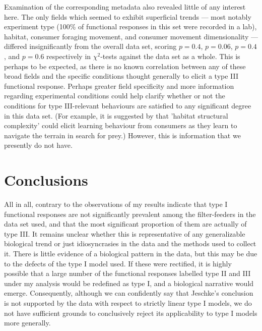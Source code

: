 \documentclass[11pt]{article}
\begin{document}
    Examination of the corresponding metadata also revealed little of any interest here. The only fields which seemed to exhibit superficial trends — most notably experiment type (100\% of functional responses in this set were recorded in a lab), habitat, consumer foraging movement, and consumer movement dimensionality — differed insignificantly from the overall data set, scoring $p=0.4$, $p=0.06$, $p=0.4$, and $p=0.6$ respectively in $\chi^2$-tests against the data set as a whole. This is perhaps to be expected, as there is no known correlation between any of these broad fields and the specific conditions thought generally to elicit a type III functional response. Perhaps greater field specificity and more information regarding experimental conditions could help clarify whether or not the conditions for type III-relevant behaviours are satisfied to any significant degree in this data set. (For example, it is suggested by \citet{pawar2012dimensionality} that 'habitat structural complexity' could elicit learning behaviour from consumers as they learn to navigate the terrain in search for prey.) However, this is information that we presently do not have.
    
    \section{Conclusions}
    
    All in all, contrary to the observations of \citet{jeschke2004consumer} my results indicate that type I functional responses are not significantly prevalent among the filter-feeders in the data set used, and that the most significant proportion of them are actually of type III. It remains unclear whether this is representative of any generalizable biological trend or just idiosyncrasies in the data and the methods used to collect it. There is little evidence of a biological pattern in the data, but this may be due to the defects of the type I model used. If these were rectified, it is highly possible that a large number of the functional responses labelled type II and III under my analysis would be redefined as type I, and a biological narrative would emerge. Consequently, although we can confidently say that Jeschke's conclusion is not supported by the data with respect to strictly linear type I models, we do not have sufficient grounds to conclusively reject its applicability to type I models more generally.

    \newpage
    
    
\end{document}
